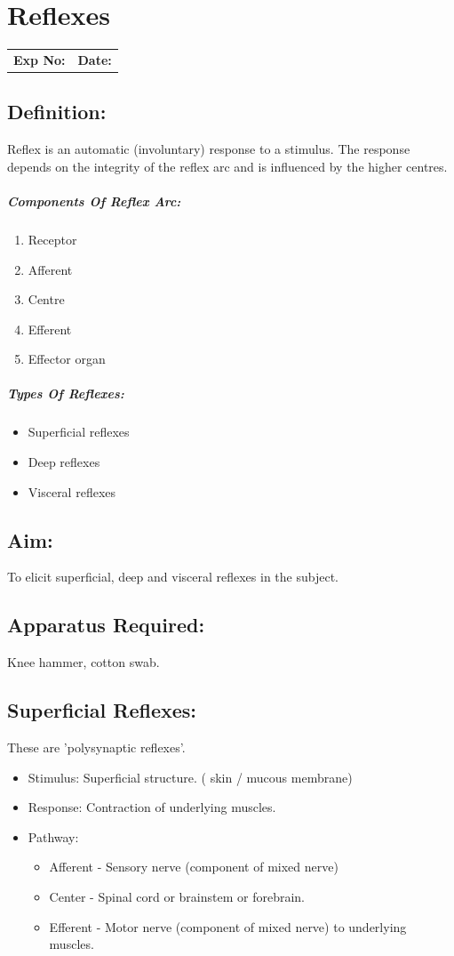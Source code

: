 \documentclass[a4paper,12pt]{book}
\begin{document}
															\chapter*{\centering Reflexes}
															\begin{tabular}{p{5in} p{1in}}
																\textbf{Exp No:}  & \textbf{Date:}\\
															\end{tabular}
															\section*{Definition:}
Reflex is an automatic (involuntary) response to a stimulus. The response depends on the integrity of the reflex arc and is influenced by the higher centres.
\paragraph{Components Of Reflex Arc:}
\begin{enumerate}
\item{ Receptor}
\item{ Afferent}
\item{ Centre}
\item{ Efferent}
\item{ Effector organ}
\end{enumerate}
\paragraph{Types Of Reflexes:}
\begin{itemize}
\item{Superficial reflexes}
\item{Deep reflexes}
\item{Visceral reflexes}
\end{itemize}
\section*{Aim:} 
To elicit superficial, deep and visceral reflexes in the subject.
\section*{Apparatus Required:}
Knee hammer, cotton swab.
\section*{Superficial Reflexes: }
These are 'polysynaptic reflexes'.
\begin{itemize}
\item{Stimulus: Superficial structure. ( skin / mucous membrane)}
\item{Response: Contraction of underlying muscles.}
\item{Pathway:}
	\begin{itemize}
\item{Afferent - Sensory nerve (component of mixed nerve)}
\item{Center - Spinal cord or brainstem or forebrain.}
\item{Efferent - Motor nerve (component of mixed nerve) to underlying muscles.}
	\end{itemize}
\end{itemize}
\end{document}
